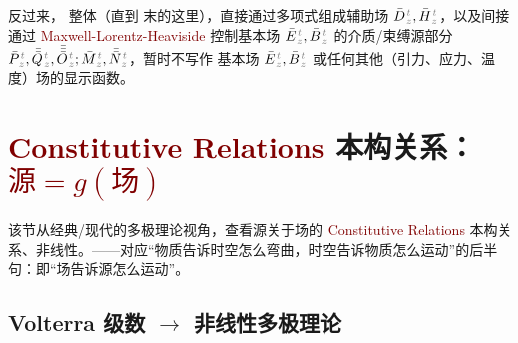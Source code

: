 反过来， 整体（直到  末的这里），直接通过多项式组成辅助场 $\bar{D}^{\;\!\mathcolor{gray}{t}}_{\;\!\mathcolor{gray}{z}}, \bar{H}^{\;\!\mathcolor{gray}{t}}_{\;\!\mathcolor{gray}{z}}$，以及间接通过 \textcolor{Maroon}{Maxwell-Lorentz-Heaviside}  控制基本场 $\bar{E}^{\;\!\mathcolor{gray}{t}}_{\;\!\mathcolor{gray}{z}}, \bar{B}^{\;\!\mathcolor{gray}{t}}_{\;\!\mathcolor{gray}{z}}$ 的介质/束缚源部分 $\bar{P}^{\;\!\mathcolor{gray}{t}}_{\;\!\mathcolor{gray}{z}},\bar{\bar{Q}}^{\;\!\mathcolor{gray}{t}}_{\;\!\mathcolor{gray}{z}},\bar{\bar{\bar{O}}}^{\;\!\mathcolor{gray}{t}}_{\;\!\mathcolor{gray}{z}} ; \bar{M}^{\;\!\mathcolor{gray}{t}}_{\;\!\mathcolor{gray}{z}}, \bar{\bar{N}}^{\;\!\mathcolor{gray}{t}}_{\;\!\mathcolor{gray}{z}}$，暂时不写作 基本场 $\bar{E}^{\;\!\mathcolor{gray}{t}}_{\;\!\mathcolor{gray}{z}}, \bar{B}^{\;\!\mathcolor{gray}{t}}_{\;\!\mathcolor{gray}{z}}$ 或任何其他（引力、应力、温度）场的显示函数。

\section{\textcolor{Maroon}{Constitutive Relations} 本构关系：\textcolor{Maroon}{$\text{源} = g(\text{场})$}}\label{sec:constitutive}

该节从经典/现代的多极理论视角，查看源关于场的 \textcolor{Maroon}{Constitutive Relations} 本构关系、非线性。——对应“物质告诉时空怎么弯曲，时空告诉物质怎么运动”的后半句：即“场告诉源怎么运动”。

\vspace*{-4.0em}

\subsection{Volterra 级数 $\to$ 非线性多极理论}\label{ssec:PMQN-nonlinear}

